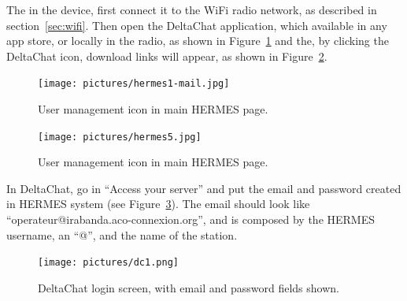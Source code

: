 \documentclass[11pt,a4paper]{article}
\begin{document}
The in the device, first connect it to the WiFi radio network, as described in section~\ref{sec:wifi}. Then open
the DeltaChat application, which available in any app store, or locally in the radio, as shown in Figure~\ref{fig:hermes1mail} and the, by clicking the DeltaChat icon, download links will appear,
as shown in Figure~\ref{fig:hermes5}.

\begin{figure}[H]
  \centering
  \texttt{[image: pictures/hermes1-mail.jpg]}
  \caption{User management icon in main HERMES page.}
  \label{fig:hermes1mail}
\end{figure}

\begin{figure}[H]
  \centering
  \texttt{[image: pictures/hermes5.jpg]}
  \caption{User management icon in main HERMES page.}
  \label{fig:hermes5}
\end{figure}

In DeltaChat, go in ``Access your server'' and put the email and password created in HERMES system (see Figure~\ref{fig:dc1}). The email should look like
``operateur@irabanda.aco-connexion.org'', and is composed by the HERMES username, an ``@'', and the name of the station.

\begin{figure}[H]
  \centering
  \texttt{[image: pictures/dc1.png]}
  \caption{DeltaChat login screen, with email and password fields shown.}
  \label{fig:dc1}
\end{figure}

\end{document}
